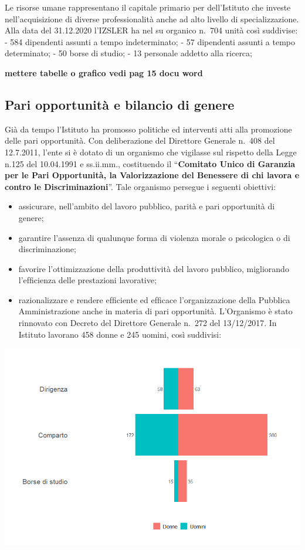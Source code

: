 \documentclass[
  12pt,
]{article}
\providecommand{\tightlist}{%
  \setlength{\itemsep}{0pt}\setlength{\parskip}{0pt}}
\begin{document}
Le risorse umane rappresentano il capitale primario per dell'Istituto
che investe nell'acquisizione di diverse professionalità anche ad alto
livello di specializzazione. Alla data del 31.12.2020 l'IZSLER ha nel su
organico n.~704 unità così suddivise: - 584 dipendenti assunti a tempo
indeterminato; - 57 dipendenti assunti a tempo determinato; - 50 borse
di studio; - 13 personale addetto alla ricerca;

\textbf{mettere tabelle o grafico vedi pag 15 docu word}

\hypertarget{pari-opportunituxe0-e-bilancio-di-genere}{%
\subsection{Pari opportunità e bilancio di
genere}\label{pari-opportunituxe0-e-bilancio-di-genere}}

Già da tempo l'Istituto ha promosso politiche ed interventi atti alla
promozione delle pari opportunità. Con deliberazione del Direttore
Generale n.~408 del 12.7.2011, l'ente si è dotato di un organismo che
vigilasse sul rispetto della Legge n.125 del 10.04.1991 e ss.ii.mm.,
costituendo il ``\textbf{Comitato Unico di Garanzia per le Pari
Opportunità, la Valorizzazione del Benessere di chi lavora e contro le
Discriminazioni}''. Tale organismo persegue i seguenti obiettivi:

\begin{itemize}
\tightlist
\item
  assicurare, nell'ambito del lavoro pubblico, parità e pari opportunità
  di genere;
\item
  garantire l'assenza di qualunque forma di violenza morale o
  psicologica o di discriminazione;
\item
  favorire l'ottimizzazione della produttività del lavoro pubblico,
  migliorando l'efﬁcienza delle prestazioni lavorative;
\item
  razionalizzare e rendere efﬁciente ed efﬁcace l'organizzazione della
  Pubblica Amministrazione anche in materia di pari opportunità.
  L'Organismo è stato rinnovato con Decreto del Direttore Generale
  n.~272 del 13/12/2017. In Istituto lavorano 458 donne e 245 uomini,
  così suddivisi:
\end{itemize}

\begin{center}\includegraphics[width=0.9\linewidth]{figure/genere} \end{center}
\end{document}
